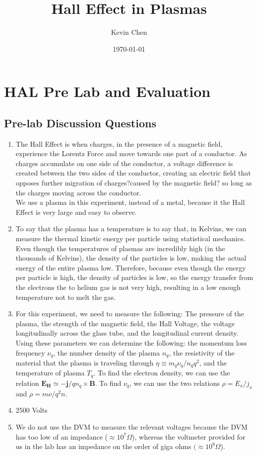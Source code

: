 \documentclass{article}
\title{Hall Effect in Plasmas}
\author{Kevin Chen}
\date{\today}
\begin{document}
\maketitle

\section*{HAL Pre Lab and Evaluation}
\subsection*{Pre-lab Discussion Questions}
\begin{enumerate}
\item The Hall Effect is when charges, in the presence of a magnetic field, experience the Lorentz Force and move towards one part of a conductor. As charges accumulate on one side of the conductor, a voltage difference is created between the two sides of the conductor, creating an electric field that opposes further migration of charges?caused by the magnetic field? so long as the charges moving across the conductor. \\
We use a plasma in this experiment, instead of a metal, because it the Hall Effect is very large and easy to observe.
\item To say that the plasma has a temperature is to say that, in Kelvins, we can measure the thermal kinetic energy per particle using statistical mechanics. Even though the temperatures of plasmas are incredibly high (in the thousands of Kelvins), the density of the particles is low, making the actual energy of the entire plasma low. Therefore, because even though the energy per particle is high, the density of particles is low, so the energy transfer from the electrons the to helium gas is not very high, resulting in a low enough temperature not to melt the gas. 
\item For this experiment, we need to measure the following: The pressure of the plasma, the strength of the magnetic field, the Hall Voltage, the voltage longitudinally across the glass tube, and the longitudinal current density. Using these parameters we can determine the following: the momentum loss frequency $\nu_q$, the number density of the plasma $n_q$, the resistivity of the material that the plasma is traveling through $\eta \equiv m_q \nu_q / n_q q^2$, and the temperature of plasma $T_q$.
To find the electron density, we can use the relation  $\mathbf{E_H} \simeq - \mathbf{j}/q n_q \times \mathbf{B}$. To find $\nu_q$, we can use the two relations $\rho = E_x/j_x$ and $\rho = m\nu / q^2 n$.
\item 2500 Volts
\item We do not use the DVM to measure the relevant voltages because the DVM has too low of an impedance ($\approx 10^7 \Omega$), whereas the voltmeter provided for us in the lab has an impedance on the order of giga ohms $(\approx 10^9 \Omega$).

\end{enumerate}
\end{document}
